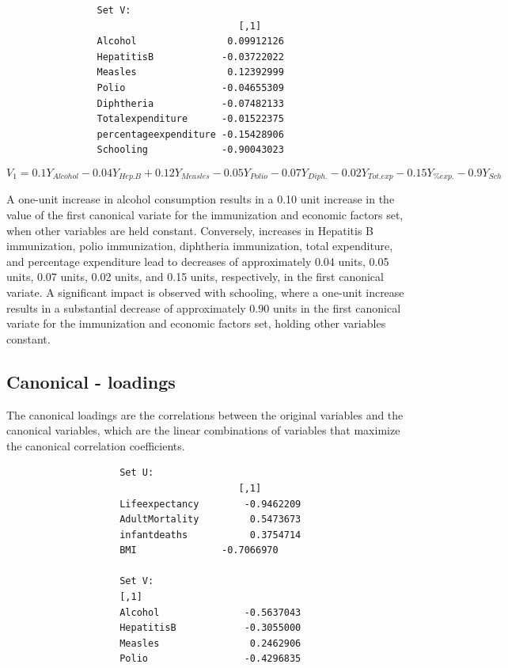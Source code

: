 \documentclass[11pt]{article}
\begin{document}
		
		\begin{tcolorbox}[colback=white, colframe=white]
			\begin{verbatim}
				Set V:
				                         [,1]
				Alcohol                0.09912126 
				HepatitisB            -0.03722022 
				Measles                0.12392999  
				Polio                 -0.04655309 
				Diphtheria            -0.07482133 
				Totalexpenditure      -0.01522375
				percentageexpenditure -0.15428906
				Schooling             -0.90043023 
			\end{verbatim}
		\end{tcolorbox}
		
		\begin{equation}
			V_1 = 0.1 Y_{Alcohol} - 0.04 Y_{Hep.B} + 0.12 Y_{Measles} - 0.05 Y_{Polio} - 0.07 Y_{Diph.} - 0.02 Y_{Tot.exp} - 0.15 Y_{\% exp.} - 0.9 Y_{Sch}
		\end{equation}
		
		A one-unit increase in alcohol consumption results in a 0.10 unit increase in the value of the first canonical variate for the immunization and economic factors set, when other variables are held constant. Conversely, increases in Hepatitis B immunization, polio immunization, diphtheria immunization, total expenditure, and percentage expenditure lead to decreases of approximately 0.04 units, 0.05 units, 0.07 units, 0.02 units, and 0.15 units, respectively, in the first canonical variate. A significant impact is observed with schooling, where a one-unit increase results in a substantial decrease of approximately 0.90 units in the first canonical variate for the immunization and economic factors set, holding other variables constant.
			
		\subsection{Canonical - loadings}
			The canonical loadings are the correlations between the original variables and the canonical variables, which are the linear combinations of variables that maximize the canonical correlation coefficients.
			\begin{tcolorbox}[colback=white, colframe=white]
				\begin{verbatim}
					Set U:
					                     [,1]       
					Lifeexpectancy 		  -0.9462209 
					AdultMortality 		   0.5473673 
					infantdeaths   		   0.3754714 
					BMI               -0.7066970 
					
					Set V:
					[,1]        
					Alcohol               -0.5637043  
					HepatitisB            -0.3055000 
					Measles                0.2462906 
					Polio                 -0.4296835 
				\end{verbatim}
			\end{tcolorbox}
			
\end{document}
